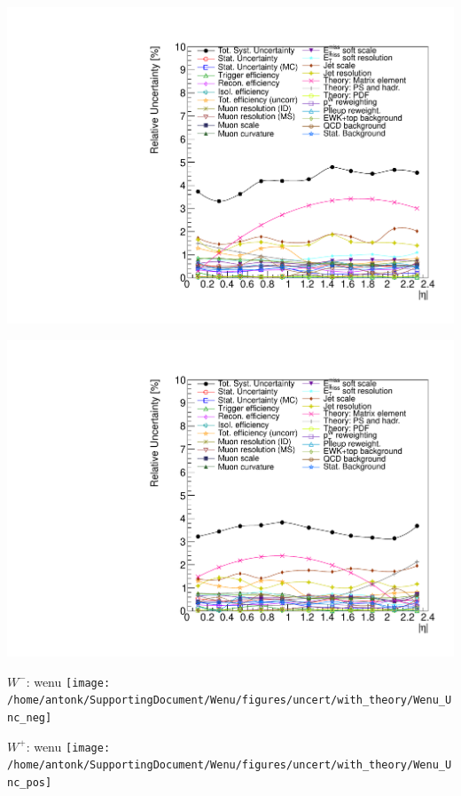 {
\colb[T]
\centering
{}
\includegraphics[width=1.0\textwidth]{dates/20130602/figures/v26.allqcd/Wmn_SYSTEM_2D_PT20_NEG_Unc_2d_Slice_7}

\centering
{}
\includegraphics[width=1.0\textwidth]{dates/20130602/figures/v26.allqcd/Wmn_SYSTEM_2D_PT20_POS_Unc_2d_Slice_7}
\cole
}


{
\colb[T]
\centering
\small{ $W^{-}$: wenu}
\texttt{[image: /home/antonk/SupportingDocument/Wenu/figures/uncert/with\_theory/Wenu\_Unc\_neg]}

\centering
\small{ $W^{+}$: wenu}
\texttt{[image: /home/antonk/SupportingDocument/Wenu/figures/uncert/with\_theory/Wenu\_Unc\_pos]}
\cole
}
